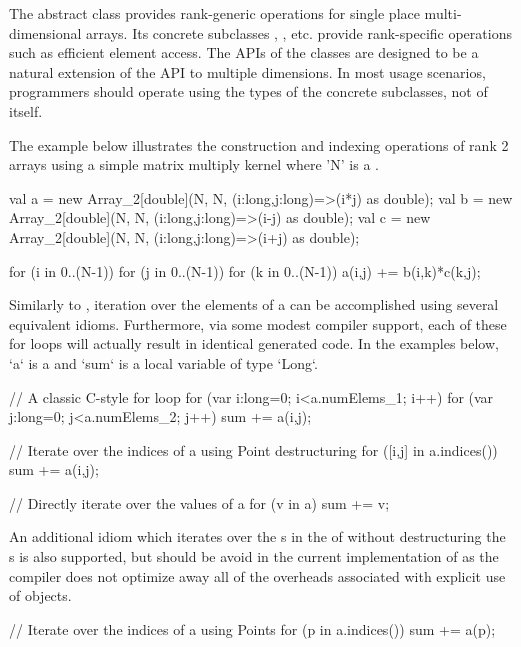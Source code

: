 The abstract  class provides rank-generic operations for
single place multi-dimensional arrays.   Its concrete subclasses
, , etc. provide rank-specific operations
such as efficient element access. The APIs of the classes are designed
to be a natural extension of the  API to multiple
dimensions.  In most usage scenarios, programmers should
operate using the types of the concrete subclasses, not of 
itself. 

The example below illustrates the construction and indexing operations
of rank 2 arrays using a simple matrix multiply kernel where \xcd'N'
is a .

\begin{xten}
val a = new Array_2[double](N, N, (i:long,j:long)=>(i*j) as double);
val b = new Array_2[double](N, N, (i:long,j:long)=>(i-j) as double);
val c = new Array_2[double](N, N, (i:long,j:long)=>(i+j) as double);

for (i in 0..(N-1))
  for (j in 0..(N-1))
    for (k in 0..(N-1))
      a(i,j) += b(i,k)*c(k,j);
\end{xten}

Similarly to , iteration over the elements of a  
can be accomplished using
several equivalent idioms.  Furthermore, via some modest compiler
support, each of these for loops will actually result in identical
generated code.  In the examples below, \xcd`a` is a 
and \xcd`sum` is a local variable of type \xcd`Long`.
\begin{xten}
// A classic C-style for loop
for (var i:long=0; i<a.numElems_1; i++) {
  for (var j:long=0; j<a.numElems_2; j++) {
    sum += a(i,j);
  }
}

// Iterate over the indices of a using Point destructuring 
for ([i,j] in a.indices()) {
    sum += a(i,j);
}

// Directly iterate over the values of a
for (v in a) {
    sum += v;
} 
\end{xten}

An additional idiom which iterates over the s in the
 of  without destructuring the s
is also supported, but should be avoid in the current implementation of
\Xten{} as the compiler does not optimize away all of the overheads
associated with explicit use of  objects.
\begin{xten}
// Iterate over the indices of a using Points
for (p in a.indices()) {
    sum += a(p);
}
\end{xten}

